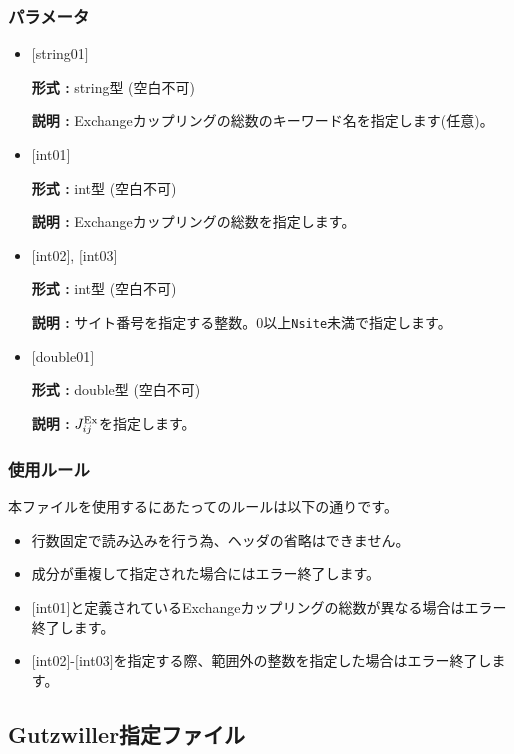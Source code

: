 \subsubsection{パラメータ}
 \begin{itemize}

   \item  $[$string01$]$
   
    {\bf 形式 :} string型 (空白不可)

   {\bf 説明 :} Exchangeカップリングの総数のキーワード名を指定します(任意)。

   \item  $[$int01$]$
   
    {\bf 形式 :} int型 (空白不可)

   {\bf 説明 :} Exchangeカップリングの総数を指定します。

  \item  $[$int02$]$, $[$int03$]$
  
 {\bf 形式 :} int型 (空白不可)

{\bf 説明 :} サイト番号を指定する整数。0以上\verb|Nsite|{未満}で指定します。
 
 \item  $[$double01$]$
   
   {\bf 形式 :} double型 (空白不可)

  {\bf 説明 :}  $J_{ij}^{\rm Ex}$を指定します。
  
\end{itemize}

\subsubsection{使用ルール}
本ファイルを使用するにあたってのルールは以下の通りです。
\begin{itemize}
\item 行数固定で読み込みを行う為、ヘッダの省略はできません。
\item 成分が重複して指定された場合にはエラー終了します。
\item $[$int01$]$と定義されているExchangeカップリングの総数が異なる場合はエラー終了します。
\item $[$int02$]$-$[$int03$]$を指定する際、範囲外の整数を指定した場合はエラー終了します。
\end{itemize}

\newpage
\subsection{Gutzwiller指定ファイル}
\label{Subsec:Gutzwiller}


